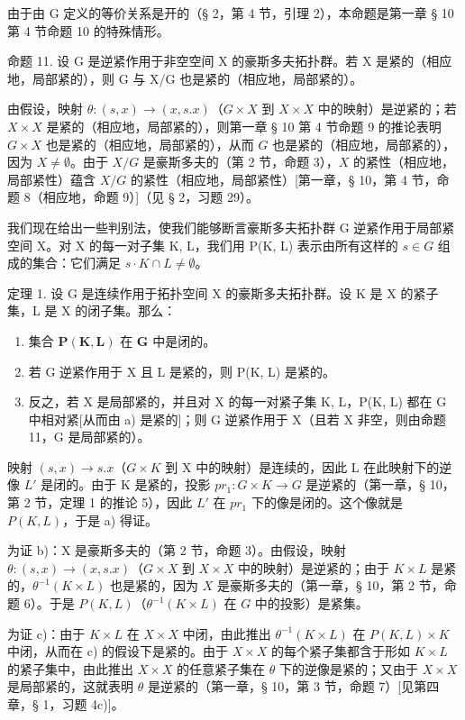 由于由 G 定义的等价关系是开的（§ 2，第 4 节，引理 2），本命题是第一章 § 10 第 4 节命题 10 的特殊情形。

命题 11. 设 G 是逆紧作用于非空空间 X 的豪斯多夫拓扑群。若 X 是紧的（相应地，局部紧的），则 G 与 X/G 也是紧的（相应地，局部紧的）。

由假设，映射 \(\theta : (s, x) \to (x, s.x)\)（\(G \times X\) 到 \(X \times X\) 中的映射）是逆紧的；若 \(X \times X\) 是紧的（相应地，局部紧的），则第一章 § 10 第 4 节命题 9 的推论表明 \(G \times X\) 也是紧的（相应地，局部紧的），从而 \(G\) 也是紧的（相应地，局部紧的），因为 \(X \neq \emptyset\)。由于 \(X/G\) 是豪斯多夫的（第 2 节，命题 3），\(X\) 的紧性（相应地，局部紧性）蕴含 \(X/G\) 的紧性（相应地，局部紧性）{[}第一章，§ 10，第 4 节，命题 8（相应地，命题 9）{]}（见 § 2，习题 29）。

我们现在给出一些判别法，使我们能够断言豪斯多夫拓扑群 G 逆紧作用于局部紧空间 X。对 X 的每一对子集 K, L，我们用 P(K, L) 表示由所有这样的 \(s \in G\) 组成的集合：它们满足 \(s \cdot K \cap L \neq \emptyset\)。

定理 1. 设 G 是连续作用于拓扑空间 X 的豪斯多夫拓扑群。设 K 是 X 的紧子集，L 是 X 的闭子集。那么：

\begin{enumerate}
\def\labelenumi{\alph{enumi})}
\item
  集合 \(\mathbf{P}(\mathbf{K},\mathbf{L})\) 在 \(\mathbf{G}\) 中是闭的。
\item
  若 G 逆紧作用于 X 且 L 是紧的，则 P(K, L) 是紧的。
\item
  反之，若 X 是局部紧的，并且对 X 的每一对紧子集 K, L，P(K, L) 都在 G 中相对紧{[}从而由 a) 是紧的{]}；则 G 逆紧作用于 X（且若 X 非空，则由命题 11，G 是局部紧的）。
\end{enumerate}

映射 \((s, x) \to s.x\)（\(G \times K\) 到 X 中的映射）是连续的，因此 L 在此映射下的逆像 \(L'\) 是闭的。由于 K 是紧的，投影 \(pr_{1}: G \times K \to G\) 是逆紧的（第一章，§ 10，第 2 节，定理 1 的推论 5），因此 \(L'\) 在 \(pr_{1}\) 下的像是闭的。这个像就是 \(P(K, L)\)，于是 a) 得证。

为证 b)：X 是豪斯多夫的（第 2 节，命题 3）。由假设，映射 \(\theta: (s, x) \to (x, s.x)\)（\(G \times X\) 到 \(X \times X\) 中的映射）是逆紧的；由于 \(K \times L\) 是紧的，\(\theta^{-1}(K \times L)\) 也是紧的，因为 \(X\) 是豪斯多夫的（第一章，§ 10，第 2 节，命题 6）。于是 \(P(K, L)\)（\(\theta^{-1}(K \times L)\) 在 \(G\) 中的投影）是紧集。

为证 c)：由于 \(K \times L\) 在 \(X \times X\) 中闭，由此推出 \(\theta^{-1}(K \times L)\) 在 \(P(K, L) \times K\) 中闭，从而在 c) 的假设下是紧的。由于 \(X \times X\) 的每个紧子集都含于形如 \(K \times L\) 的紧子集中，由此推出 \(X \times X\) 的任意紧子集在 \(\theta\) 下的逆像是紧的；又由于 \(X \times X\) 是局部紧的，这就表明 \(\theta\) 是逆紧的（第一章，§ 10，第 3 节，命题 7）{[}见第四章，§ 1，习题 4c){]}。

